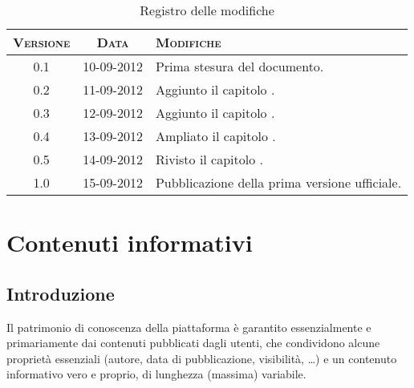 \documentclass[10pt,a4paper,headinclude,footinclude,hidelinks]{scrreprt} %
\begin{document}
    \title{\rmfamily\normalfont{}}
    \author{}
    \date{\today}
    
    \maketitle
    
    \begin{abstract}
        \noindent Il documento presenta i risultati delle fasi di analisi e di progettazione dei nuovi criteri di classificazione.
    \end{abstract}
    
	\begin{table}[ht]
	\centering
	\begin{tabular}{|c|c|l|}
	\hline
	\textsc{Versione} & \textsc{Data} & \textsc{Modifiche} \\ \hline
	0.1 & 10-09-2012 & Prima stesura del documento. \\ \hline
	0.2 & 11-09-2012 & Aggiunto il capitolo \nameref{ch:stage:contenuti}. \\ \hline
	0.3 & 12-09-2012 & Aggiunto il capitolo \nameref{ch:stage:req}. \\ \hline
	0.4 & 13-09-2012 & Ampliato il capitolo \nameref{ch:stage:req}. \\ \hline
	0.5 & 14-09-2012 & Rivisto il capitolo \nameref{ch:stage:req}. \\ \hline
	1.0 & 15-09-2012 & Pubblicazione della prima versione ufficiale. \\ \hline
	\end{tabular}
	\caption{Registro delle modifiche}
	\label{tab:stage:wp:workload}
	\end{table}

	\tableofcontents

	\chapter{Contenuti informativi}
	\label{ch:stage:contenuti}
	\section{Introduzione}
	Il patrimonio di conoscenza della piattaforma è garantito essenzialmente e primariamente dai contenuti pubblicati dagli utenti, che condividono alcune proprietà essenziali (autore, data di pubblicazione, visibilità, \ldots) e un contenuto informativo vero e proprio, di lunghezza (massima) variabile.
\end{document}
